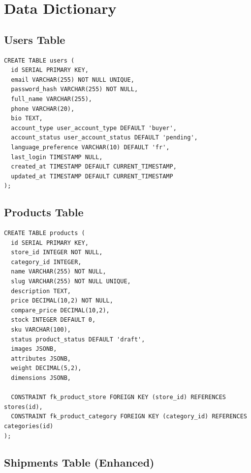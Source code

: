 \documentclass[12pt,a4paper]{report}
\begin{document}
\chapter{Data Dictionary}

\section{Users Table}

\begin{lstlisting}[caption=Users Table DDL]
CREATE TABLE users (
  id SERIAL PRIMARY KEY,
  email VARCHAR(255) NOT NULL UNIQUE,
  password_hash VARCHAR(255) NOT NULL,
  full_name VARCHAR(255),
  phone VARCHAR(20),
  bio TEXT,
  account_type user_account_type DEFAULT 'buyer',
  account_status user_account_status DEFAULT 'pending',
  language_preference VARCHAR(10) DEFAULT 'fr',
  last_login TIMESTAMP NULL,
  created_at TIMESTAMP DEFAULT CURRENT_TIMESTAMP,
  updated_at TIMESTAMP DEFAULT CURRENT_TIMESTAMP
);
\end{lstlisting}

\section{Products Table}

\begin{lstlisting}[caption=Products Table DDL]
CREATE TABLE products (
  id SERIAL PRIMARY KEY,
  store_id INTEGER NOT NULL,
  category_id INTEGER,
  name VARCHAR(255) NOT NULL,
  slug VARCHAR(255) NOT NULL UNIQUE,
  description TEXT,
  price DECIMAL(10,2) NOT NULL,
  compare_price DECIMAL(10,2),
  stock INTEGER DEFAULT 0,
  sku VARCHAR(100),
  status product_status DEFAULT 'draft',
  images JSONB,
  attributes JSONB,
  weight DECIMAL(5,2),
  dimensions JSONB,
  
  CONSTRAINT fk_product_store FOREIGN KEY (store_id) REFERENCES stores(id),
  CONSTRAINT fk_product_category FOREIGN KEY (category_id) REFERENCES categories(id)
);
\end{lstlisting}

\section{Shipments Table (Enhanced)}
\end{document}
